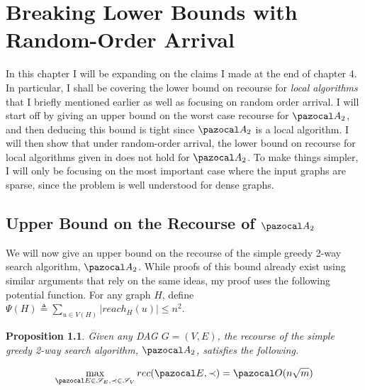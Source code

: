 \documentclass{report}
\newtheorem{proposition}[theorem]{Proposition}
\begin{document}
\chapter{Breaking Lower Bounds with Random-Order Arrival}\label{chapter5}

In this chapter I will be expanding on the claims I made at the end of chapter 4. In particular, I shall be covering the lower bound on recourse for \textit{local algorithms} that I briefly mentioned earlier as well as focusing on random order arrival. I will start off by giving an upper bound on the worst case recourse for $\pazocal A_2$, and then deducing this bound is tight since $\pazocal A_2$ is a local algorithm. I will then show that under random-order arrival, the lower bound on recourse for local algorithms given in \cite{HaeuplerKMST12} does not hold for $\pazocal A_2$. To make things simpler, I will only be focusing on the most important case where the input graphs are sparse, since the problem is well understood for dense graphs.

\section{Upper Bound on the Recourse of $\pazocal A_2$ }

We will now give an upper bound on the recourse of the simple greedy 2-way search algorithm, $\pazocal A_2$. While proofs of this bound already exist using similar arguments that rely on the same ideas, my proof uses the following potential function. For any graph $H$, define $\Psi(H) \triangleq \sum_{u \in V(H)}\vert reach_{H}(u) \vert \leq n^{2}$.

\begin{proposition}
Given any DAG $G=(V,E)$, the recourse of the simple greedy 2-way search algorithm, $\pazocal A_2$, satisfies the following.

\[ \max_{\pazocal E \in \mathcal S_E, \prec \in \mathcal S_V} rec(\pazocal E, \prec) =  \pazocal O (n \sqrt m) \]
\end{proposition}
\end{document}
